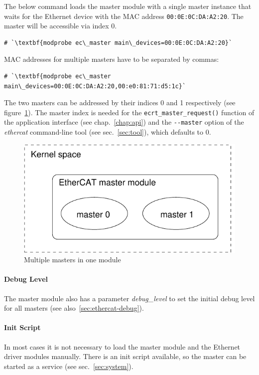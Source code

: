\documentclass[a4paper,12pt,BCOR6mm,bibtotoc,idxtotoc]{scrbook}
\begin{document}
The below command loads the master module with a single master instance that
waits for the Ethernet device with the MAC address
\lstinline+00:0E:0C:DA:A2:20+. The master will be accessible via index $0$.

\begin{lstlisting}
# `\textbf{modprobe ec\_master main\_devices=00:0E:0C:DA:A2:20}`
\end{lstlisting}

MAC addresses for multiple masters have to be separated by commas:

\begin{lstlisting}
# `\textbf{modprobe ec\_master main\_devices=00:0E:0C:DA:A2:20,00:e0:81:71:d5:1c}`
\end{lstlisting}

The two masters can be addressed by their indices 0 and 1 respectively (see
figure~\ref{fig:masters}). The master index is needed for the
\lstinline+ecrt_master_request()+ function of the application interface (see
chap.~\ref{chap:api}) and the \lstinline+--master+ option of the
\textit{ethercat} command-line tool (see sec.~\ref{sec:tool}), which defaults
to $0$.

\begin{figure}[htbp]
  \centering
  \includegraphics[width=.5\textwidth]{images/masters}
  \caption{Multiple masters in one module}
  \label{fig:masters}
\end{figure}

\paragraph{Debug Level} The master module also has a parameter
\textit{debug\_level} to set the initial debug level for all masters (see
also~\ref{sec:ethercat-debug}).

\paragraph{Init Script}

In most cases it is not necessary to load the master module and the Ethernet
driver modules manually. There is an init script available, so the master can
be started as a service (see sec.~\ref{sec:system}).
\end{document}
